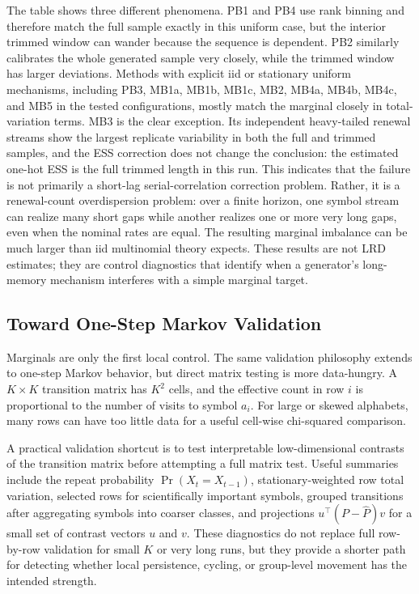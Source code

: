 \documentclass[journal]{IEEEtran}
\begin{document}
The table shows three different phenomena. PB1 and PB4 use rank binning and
therefore match the full sample exactly in this uniform case, but the interior
trimmed window can wander because the sequence is dependent. PB2 similarly
calibrates the whole generated sample very closely, while the trimmed window has
larger deviations. Methods with explicit iid or stationary uniform mechanisms,
including PB3, MB1a, MB1b, MB1c, MB2, MB4a, MB4b, MB4c, and MB5 in the tested configurations,
mostly match the marginal closely in total-variation terms. MB3 is the clear
exception. Its independent heavy-tailed renewal streams show the largest
replicate variability in both the full and trimmed samples, and the ESS
correction does not change the conclusion: the estimated one-hot ESS is the full
trimmed length in this run. This indicates that the failure is not primarily a
short-lag serial-correlation correction problem. Rather, it is a renewal-count
overdispersion problem: over a finite horizon, one symbol stream can realize many
short gaps while another realizes one or more very long gaps, even when the
nominal rates are equal. The resulting marginal imbalance can be much larger
than iid multinomial theory expects. These results are not LRD estimates; they
are control diagnostics that identify when a generator's long-memory mechanism
interferes with a simple marginal target.

\subsection{Toward One-Step Markov Validation}

Marginals are only the first local control.  The same validation philosophy
extends to one-step Markov behavior, but direct matrix testing is more
data-hungry.  A \(K\times K\) transition matrix has \(K^2\) cells, and the
effective count in row \(i\) is proportional to the number of visits to
symbol \(a_i\).  For large or skewed alphabets, many rows can have too little
data for a useful cell-wise chi-squared comparison.

A practical validation shortcut is to test interpretable low-dimensional
contrasts of the transition matrix before attempting a full matrix test. Useful
summaries include the repeat probability
\(\Pr(X_t=X_{t-1})\), stationary-weighted row total variation, selected rows
for scientifically important symbols, grouped transitions after aggregating
symbols into coarser classes, and projections \(u^\top(P-\hat P)v\) for a small
set of contrast vectors \(u\) and \(v\). These diagnostics do not replace full
row-by-row validation for small \(K\) or very long runs, but they provide a
shorter path for detecting whether local persistence, cycling, or group-level
movement has the intended strength.
\end{document}
